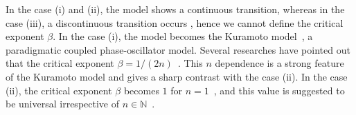 In the case (i) and (ii), the model shows a continuous transition,
whereas in the case (iii), a discontinuous transition occurs \cite{chiba2011}, 
hence we cannot define the critical exponent $\beta$.
In the case (i), the model becomes the Kuramoto model~\cite{kuramoto1975}, a paradigmatic coupled phase-oscillator model.
Several researches have pointed out that the critical exponent $\beta=1/(2n)$~\cite{kuramoto1975,strogatz2000,chiba2015,daido2015}.
This $n$ dependence is a strong feature of the Kuramoto model
and gives a sharp contrast with the case (ii).
In the case (ii), the critical exponent $\beta$ becomes $1$ for $n=1$~\cite{crawford1995,chiba2011,pikovsky2013,komarov2014},
and this value is suggested to be universal irrespective of $n\in\mathbb{N}$~\cite{chiba2011}.

%

